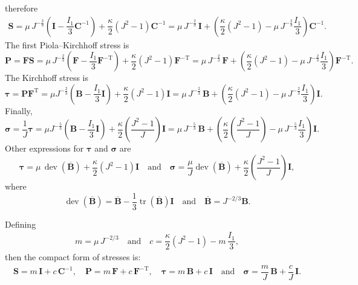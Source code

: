\documentclass[11pt,a4paper]{article}
\newcommand{\tr}{\operatorname{tr}}
\newcommand{\dev}{\operatorname{dev}}
\newcommand{\Id}{\textbf{I}}
\begin{document}
%
therefore
%
\begin{eqnarray}\label{eq_Sgeneral}
\boxed{\textbf{S}=\mu\,J^{-\frac{2}{3}}
\left(
\Id-\dfrac{I_1}{3}\textbf{C}^{-1}
\right)
+\dfrac{\kappa}{2}(J^2-1)\textbf{C}^{-1}=\mu\,J^{-\frac{2}{3}}
\,\Id
+\left( \dfrac{\kappa}{2}(J^2-1)-\mu\,J^{-\frac{2}{3}}\dfrac{I_1}{3}\right) \textbf{C}^{-1}}.
\end{eqnarray}
%
The first Piola--Kirchhoff stress is
%
\begin{equation}\label{eq_Pgeneral}
\boxed{\textbf{P}=\textbf{F}\textbf{S}
=\mu\, J^{-\frac{2}{3}}
\left(
\textbf{F}-\dfrac{I_1}{3}\textbf{F}^{-\text{T}}
\right)
+\dfrac{\kappa}{2}(J^2-1)\textbf{F}^{-\text{T}}=\mu\,J^{-\frac{2}{3}}
\,\textbf{F}
+\left( \dfrac{\kappa}{2}(J^2-1)-\mu\,J^{-\frac{2}{3}}\dfrac{I_1}{3}\right) \textbf{F}^{-\text{T}}}.
\end{equation}
%
The Kirchhoff stress is
%
\begin{equation}\label{eq_taugeneral}
	\boxed{\boldsymbol{\tau}=\textbf{P}\textbf{F}^{\text{T}}
	=\mu J^{-\frac{2}{3}}
	\left(
	\textbf{B}-\dfrac{I_1}{3}\Id
	\right)
	+\dfrac{\kappa}{2}(J^2-1)\Id=\mu\,J^{-\frac{2}{3}}
	\,\textbf{B}
	+\left( \dfrac{\kappa}{2}(J^2-1)-\mu\,J^{-\frac{2}{3}}\dfrac{I_1}{3}\right) \Id}.
\end{equation}
%
Finally,
%
\begin{equation}\label{eq_sigmaSource}
	\boxed{\boldsymbol{\sigma}=\dfrac1J\boldsymbol{\tau}
	=\mu J^{-\frac{5}{3}}
	\left(
	\textbf{B}-\dfrac{I_1}{3}\Id
	\right)
	+\dfrac{\kappa}{2}\left( \dfrac{J^2-1}{J}\right) \Id=\mu\,J^{-\frac{5}{3}}
	\,\textbf{B}
	+\left( \dfrac{\kappa}{2}\left( \dfrac{J^2-1}{J}\right)-\mu\,J^{-\frac{5}{3}}\dfrac{I_1}{3}\right) \Id}.
\end{equation}
%
Other expressions for $\boldsymbol{\tau}$ and $\boldsymbol{\sigma}$ are
%
\begin{equation}
	\boldsymbol{\tau}
=\mu\,\dev(\overline{\textbf{B}})
+\dfrac{\kappa}{2}\left( J^2-1\right) \Id
\quad\text{and}\quad
	\boldsymbol{\sigma}
	=\dfrac{\mu}{J}\dev(\overline{\textbf{B}})
	+\dfrac{\kappa}{2}\left( \dfrac{J^2-1}{J}\right) \Id,
\end{equation}
%
where
%
\begin{equation}
	\dev(\overline{\textbf{B}})=\overline{\textbf{B}}-\dfrac13\tr(\overline{\textbf{B}})\Id\quad\text{and}\quad \overline{\textbf{B}}=J^{-2/3}\textbf{B}.
\end{equation}

Defining
%
\begin{eqnarray}\label{eq_mc}
\boxed{m=\mu\,J^{-2/3}\quad\text{and}\quad c=\dfrac{\kappa}{2}\left(J^2-1\right)-m\,\dfrac{I_1}{3}},
\end{eqnarray}
%
then the compact form of stresses is:
%
\begin{eqnarray}\label{eq_stressesCompact}
\boxed{\textbf{S}=m\,\textbf{I}+c\,\textbf{C}^{-1},\quad\textbf{P}=m\,\textbf{F}+c\,\textbf{F}^{-\text{T}},\quad \boldsymbol{\tau}=m\,\textbf{B}+c\,\textbf{I}\quad\text{and}\quad \boldsymbol{\sigma}=\dfrac{m}{J}\,\textbf{B}+\dfrac{c}{J}\,\textbf{I}}.
\end{eqnarray}
\end{document}

